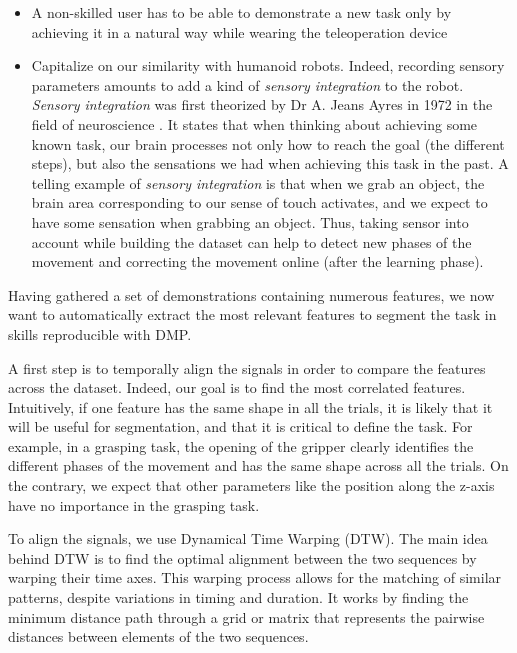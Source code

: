 \documentclass[a4paper, 10pt, conference]{ieeeconf}
\begin{document}
 \begin{itemize}
     \item A non-skilled user has to be able to demonstrate a new task only by achieving it in a  natural way while wearing the teleoperation device
     \item Capitalize on our similarity with humanoid robots. Indeed, recording sensory parameters amounts to add a kind of \textit{sensory integration} to the robot. \textit{Sensory integration} was first theorized by Dr A. Jeans Ayres in 1972 in the field of neuroscience \cite{ayres_improving_1972}. It states that when thinking about achieving some known task, our brain processes not only how to reach the goal (the different steps), but also the sensations we had when achieving this task in the past. 
A telling example of \textit{sensory integration} is that when we grab an object, the brain area corresponding to our sense of touch activates, and we expect to have some sensation when grabbing an object. 
Thus, taking sensor into account while building the dataset can help to detect new phases of the movement \cite{sensory_seg} and correcting the movement online (after the learning phase). \newline

\end{itemize}


Having gathered a set of demonstrations containing numerous features, we now want to automatically extract the most relevant features to segment the task in skills reproducible with DMP.

A first step is to temporally align the signals in order to compare the features across the dataset. Indeed, our goal is to find the most correlated features. Intuitively, if one feature has the same shape in all the trials, it is likely that it will be useful for segmentation, and that it is critical to define the task. For example, in a grasping task, the opening of the gripper clearly identifies the different phases of the movement and has the same shape across all the trials. On the contrary, we expect that other parameters like the position along the z-axis have no importance in the grasping task.

To align the signals, we use Dynamical Time Warping (DTW). The main idea behind DTW is to find the optimal alignment between the two sequences by warping their time axes. This warping process allows for the matching of similar patterns, despite variations in timing and duration. It works by finding the minimum distance path through a grid or matrix that represents the pairwise distances between elements of the two sequences. \newline
\end{document}
